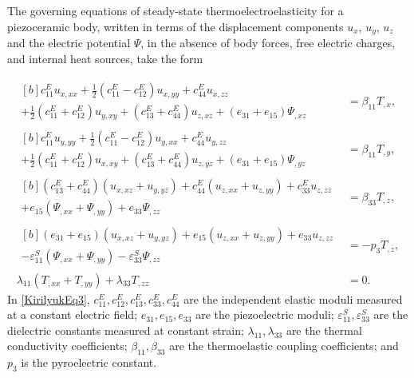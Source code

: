 The governing equations of steady-state thermoelectroelasticity for a piezoceramic body, written in terms of the displacement components $u_x$, $u_y$, $u_z$ and the electric potential $\Psi$, in the absence of body forces, free electric charges, and internal heat sources, take the form

\begin{equation}
	\begin{aligned}
		\begin{multlined}[b]
			c_{11}^{E} u_{x,xx}
			+ \tfrac12 (c_{11}^{E}-c_{12}^{E}) u_{x,yy}
			+ c_{44}^{E} u_{x,zz}
			\\
			+ \tfrac12 (c_{11}^{E}+c_{12}^{E}) u_{y,xy}
			+ (c_{13}^{E}+c_{44}^{E}) u_{z,xz}
			+ (e_{31}+e_{15})\Psi_{,xz}
		\end{multlined}
		&= \beta_{11} T_{,x},
		\\
		\begin{multlined}[b]
			c_{11}^{E} u_{y,yy}
			+ \tfrac12 (c_{11}^{E}-c_{12}^{E}) u_{y,xx}
			+ c_{44}^{E} u_{y,zz}
			\\
			+ \tfrac12 (c_{11}^{E}+c_{12}^{E}) u_{x,xy}
			+ (c_{13}^{E}+c_{44}^{E}) u_{z,yz}
			+ (e_{31}+e_{15})\Psi_{,yz}
		\end{multlined}
		&= \beta_{11} T_{,y},
		\\
		\begin{multlined}[b]
			(c_{13}^{E}+c_{44}^{E})(u_{x,xz}+u_{y,yz})
			+ c_{44}^{E}(u_{z,xx}+u_{z,yy})
			+ c_{33}^{E} u_{z,zz}
			\\
			+ e_{15}(\Psi_{,xx}+\Psi_{,yy})
			+ e_{33}\Psi_{,zz}
		\end{multlined}
		&= \beta_{33} T_{,z},
		\\
		\begin{multlined}[b]
			(e_{31}+e_{15})(u_{x,xz}+u_{y,yz})
			+ e_{15}(u_{z,xx}+u_{z,yy})
			+ e_{33}u_{z,zz}
			\\
			- \varepsilon_{11}^{S}(\Psi_{,xx}+\Psi_{,yy})
			- \varepsilon_{33}^{S}\Psi_{,zz}
		\end{multlined}
		&= -p_{3} T_{,z},
		\\
		\lambda_{11}(T_{,xx}+T_{,yy}) + \lambda_{33}T_{,zz} &= 0.
	\end{aligned}
	\label{KirilyukEq3}
\end{equation}
%
In \eqref{KirilyukEq3},
$c_{11}^{E}, c_{12}^{E}, c_{13}^{E}, c_{33}^{E}, c_{44}^{E}$ are the independent elastic moduli measured at a constant electric field;
$e_{31}, e_{15}, e_{33}$ are the piezoelectric moduli;
$\varepsilon_{11}^{S}, \varepsilon_{33}^{S}$ are the dielectric constants measured at constant strain;
$\lambda_{11}, \lambda_{33}$ are the thermal conductivity coefficients;
$\beta_{11}, \beta_{33}$ are the thermoelastic coupling coefficients; and
$p_{3}$ is the pyroelectric constant.

